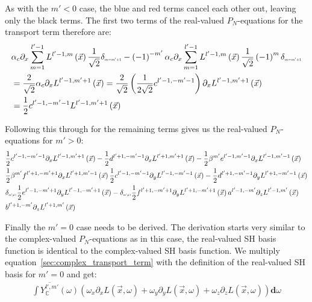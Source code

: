 \documentclass[10pt]{scrartcl}
\begin{document}
As with the $m'<0$ case, the blue and red terms cancel each other out, leaving only the black terms. The first two terms of the real-valued $P_N$-equations for the transport term therefore are:
\begin{align*}
&
\alpha_c\partial_x
\sum_{m=1}^{l'-1}L^{l'-1,m}\left (\vec{x}\right)
\frac{1}{\sqrt{2}}
\delta_{\scaleto{m=m'+1}{4pt}}
-
\left({-1}\right)^{-m'}
\alpha_c\partial_x
\sum_{m=1}^{l'-1}L^{l'-1,m}\left (\vec{x}\right)
\frac{1}{\sqrt{2}}
\left({-1}\right)^{m}
\delta_{\scaleto{m=m'+1}{4pt}}
\\&
=
\frac{2}{\sqrt{2}}
\alpha_c\partial_x
L^{l'-1,m'+1}\left (\vec{x}\right)
=
\frac{2}{\sqrt{2}}
\left(\frac{1}{2\sqrt{2}}c^{l'-1, -m'-1}\right)\partial_x
L^{l'-1,m'+1}\left (\vec{x}\right)
\\&
=
\frac{1}{2}c^{l'-1,-m'-1}L^{l'-1,m'+1}\left (\vec{x}\right)
\end{align*}

Following this through for the remaining terms gives us the real-valued $P_N$-equations for $m'>0$:
\begin{align}
&
\frac{1}{2}c^{l'-1,-m'-1}\partial_x L^{l'-1,m'+1}\left (\vec{x}\right)
-\frac{1}{2}d^{l'+1,-m'-1}\partial_x L^{l'+1,m'+1}\left (\vec{x}\right)
-\frac{1}{2}\beta^{m'}e^{l'-1,m'-1}\partial_x L^{l'-1,m'-1}\left (\vec{x}\right)
\nonumber
\\&
\frac{1}{2}\beta^{m'}f^{l'+1,-m'+1}\partial_x L^{l'+1,m'-1}\left (\vec{x}\right)
\frac{1}{2}c^{l'-1,-m'-1}\partial_y L^{l'-1,-m'-1}\left (\vec{x}\right)
-\frac{1}{2}d^{l'+1,-m'-1}\partial_y L^{l'+1,-m'-1}\left (\vec{x}\right)
\nonumber
\\&
\delta_{\scaleto{m'\neq 1}{4pt}}\frac{1}{2}e^{l'-1,-m'+1}\partial_y L^{l'-1,-m'+1}\left (\vec{x}\right)
-\delta_{\scaleto{m'\neq 1}{4pt}}\frac{1}{2}f^{l'+1,-m'+1}\partial_y L^{l'+1,-m'+1}\left (\vec{x}\right)
a^{l'-1,-m'}\partial_z L^{l'-1,m'}\left (\vec{x}\right)
\nonumber
\\&
b^{l'+1,-m'}\partial_z L^{l'+1,m'}\left (\vec{x}\right)
\nonumber
\end{align}

Finally the $m'=0$ case needs to be derived. The derivation starts very similar to the complex-valued $P_N$-equations as in this case, the real-valued SH basis function is identical to the complex-valued SH basis function. We multiply equation~\ref{sec:complex_transport_term} with the definition of the real-valued SH basis for $m'=0$ and get:
\begin{align*}
\int{\overline{Y_{\mathbb{C}}^{l', m'}}(\omega )\left(\omega_{x}\partial_xL\left (\vec{x} ,\omega \right )+\omega_{y}\partial_yL\left (\vec{x} ,\omega \right )+\omega_{z}\partial_zL\left (\vec{x} ,\omega \right )\right)\mathbf{d}\omega}
\end{align*}
\end{document}
